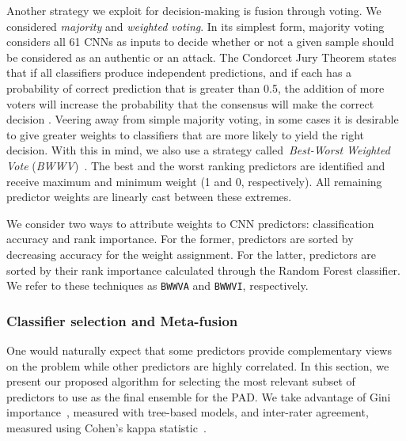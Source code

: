 Another strategy we exploit for decision-making is fusion through voting. We considered \emph{majority} and \emph{weighted voting}. 
In its simplest form, 
majority voting~\cite{kuncheva2014, kittler1998combining} considers all 61 CNNs as inputs to decide whether or not a given sample should be considered as an authentic or an attack. The Condorcet Jury Theorem states that if all classifiers produce independent predictions, and if each has a probability of correct prediction that is greater than 0.5, the addition of more voters will increase the probability that the consensus will make the correct decision \cite{kuncheva2014}. Veering away from simple majority voting, in some cases it is desirable to give greater weights to classifiers that are more likely to yield the right decision. With this in mind, we also use a strategy called~\emph{Best-Worst Weighted Vote} (\textit{BWWV})~\cite{Moreno-Seco2006}. The best and the worst ranking predictors are identified and receive maximum and minimum weight (1 and 0, respectively). All remaining predictor weights are linearly cast between these extremes.

We consider two ways to attribute weights to CNN predictors: classification accuracy and rank importance. For the former, predictors are sorted by decreasing accuracy for the weight assignment. For the latter, predictors are sorted by their rank importance calculated through the Random Forest classifier. We refer to these techniques as \texttt{BWWVA} and \texttt{BWWVI}, respectively.

\subsubsection{Classifier selection and Meta-fusion}
\label{subsec:meta_fusion_algorithm}

One would naturally expect that some predictors provide complementary views on the problem while other predictors are highly correlated.
In this section, we present our proposed algorithm for selecting the most relevant subset of predictors to use as the final ensemble for the PAD. We take advantage of {Gini} importance~\cite{Breiman:1984}, measured with tree-based models, and inter-rater agreement, measured using Cohen's kappa statistic~\cite{Fleiss:EPM:1973}.

